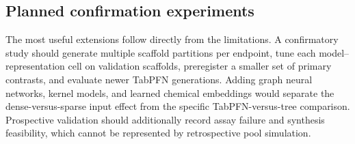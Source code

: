 \documentclass[twoside,11pt]{article}
\begin{document}
\subsection{Planned confirmation experiments}
The most useful extensions follow directly from the limitations. A confirmatory study should generate multiple scaffold partitions per endpoint, tune each model--representation cell on validation scaffolds, preregister a smaller set of primary contrasts, and evaluate newer TabPFN generations. Adding graph neural networks, kernel models, and learned chemical embeddings would separate the dense-versus-sparse input effect from the specific TabPFN-versus-tree comparison. Prospective validation should additionally record assay failure and synthesis feasibility, which cannot be represented by retrospective pool simulation.

\clearpage

\end{document}
